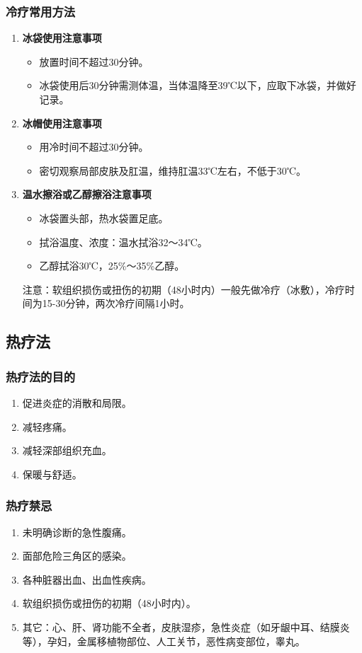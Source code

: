 \documentclass[11pt, a4paper]{ctexart}
\begin{document}
\subsubsection{冷疗常用方法}
\begin{enumerate}
    \item \textbf{冰袋使用注意事项}
    \begin{itemize}
        \item 放置时间不超过30分钟。
        \item 冰袋使用后30分钟需测体温，当体温降至39℃以下，应取下冰袋，并做好记录。
    \end{itemize}
    \item \textbf{冰帽使用注意事项}
    \begin{itemize}
        \item 用冷时间不超过30分钟。
        \item 密切观察局部皮肤及肛温，维持肛温33℃左右，不低于30℃。
    \end{itemize}
    \item \textbf{温水擦浴或乙醇擦浴注意事项}
    \begin{itemize}
        \item 冰袋置头部，热水袋置足底。
        \item 拭浴温度、浓度：温水拭浴32～34℃。
        \item 乙醇拭浴30℃，25\%～35\%乙醇。
    \end{itemize}
    注意：软组织损伤或扭伤的初期（48小时内）一般先做冷疗（冰敷），冷疗时间为15-30分钟，两次冷疗间隔1小时。
\end{enumerate}

\subsection{热疗法}
\subsubsection{热疗法的目的}
\begin{enumerate}
    \item 促进炎症的消散和局限。
    \item 减轻疼痛。
    \item 减轻深部组织充血。
    \item 保暖与舒适。
\end{enumerate}

\subsubsection{热疗禁忌}
\begin{enumerate}
    \item 未明确诊断的急性腹痛。
    \item 面部危险三角区的感染。
    \item 各种脏器出血、出血性疾病。
    \item 软组织损伤或扭伤的初期（48小时内）。
    \item 其它：心、肝、肾功能不全者，皮肤湿疹，急性炎症（如牙龈中耳、结膜炎等），孕妇，金属移植物部位、人工关节，恶性病变部位，睾丸。
\end{enumerate}
\end{document}
